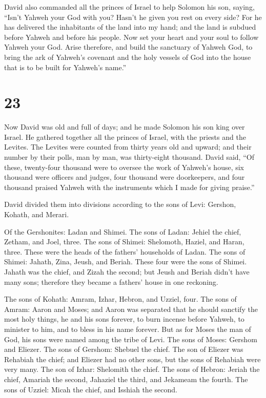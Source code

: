  David also commanded all the princes of Israel to help
Solomon his son, saying,  ``Isn't Yahweh your God with
you? Hasn't he given you rest on every side? For he has delivered the
inhabitants of the land into my hand; and the land is subdued before
Yahweh and before his people.  Now set your heart and
your soul to follow Yahweh your God. Arise therefore, and build the
sanctuary of Yahweh God, to bring the ark of Yahweh's covenant and the
holy vessels of God into the house that is to be built for Yahweh's
name.''

\hypertarget{section-22}{%
\section{23}\label{section-22}}

 Now David was old and full of days; and he made Solomon
his son king over Israel.  He gathered together all the
princes of Israel, with the priests and the Levites.  The
Levites were counted from thirty years old and upward; and their number
by their polls, man by man, was thirty-eight thousand. 
David said, ``Of these, twenty-four thousand were to oversee the work of
Yahweh's house, six thousand were officers and judges, 
four thousand were doorkeepers, and four thousand praised Yahweh with
the instruments which I made for giving praise.''

 David divided them into divisions according to the sons
of Levi: Gershon, Kohath, and Merari.

 Of the Gershonites: Ladan and Shimei.  The
sons of Ladan: Jehiel the chief, Zetham, and Joel, three. 
The sons of Shimei: Shelomoth, Haziel, and Haran, three. These were the
heads of the fathers' households of Ladan.  The sons of
Shimei: Jahath, Zina, Jeush, and Beriah. These four were the sons of
Shimei.  Jahath was the chief, and Zizah the second; but
Jeush and Beriah didn't have many sons; therefore they became a fathers'
house in one reckoning.

 The sons of Kohath: Amram, Izhar, Hebron, and Uzziel,
four.  The sons of Amram: Aaron and Moses; and Aaron was
separated that he should sanctify the most holy things, he and his sons
forever, to burn incense before Yahweh, to minister to him, and to bless
in his name forever.  But as for Moses the man of God,
his sons were named among the tribe of Levi.  The sons of
Moses: Gershom and Eliezer.  The sons of Gershom: Shebuel
the chief.  The son of Eliezer was Rehabiah the chief;
and Eliezer had no other sons, but the sons of Rehabiah were very many.
 The son of Izhar: Shelomith the chief. 
The sons of Hebron: Jeriah the chief, Amariah the second, Jahaziel the
third, and Jekameam the fourth.  The sons of Uzziel:
Micah the chief, and Isshiah the second.

